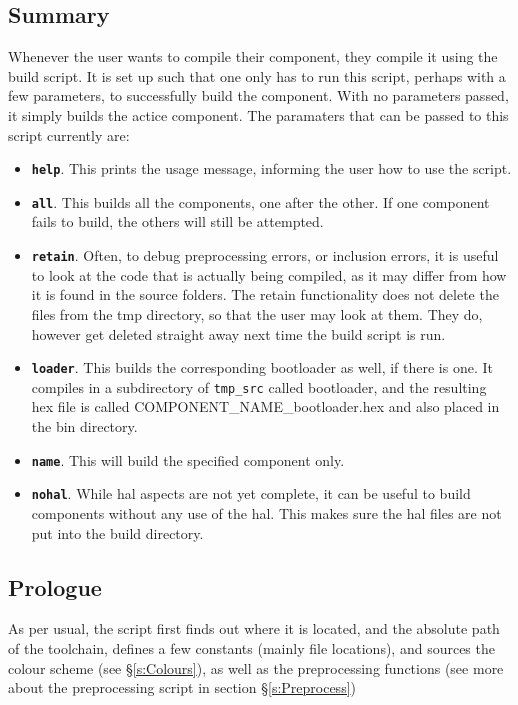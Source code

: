 \documentclass[a4paper, oneside, 11pt, titlepage, onecolumn, openright]{report}
\begin{document}
\subsection{Summary}
			\label{ss:buildSummary}
			Whenever the user wants to compile their component, they compile it using the build script. It is set up such that one only has to run this script, perhaps with a few parameters, to successfully build the component. With no parameters passed, it simply builds the actice component.
			The paramaters that can be passed to this script currently are:
			
\begin{itemize}
\item \texttt{\textbf{help}}. This prints the usage message, informing the user how to use the script.
\item \texttt{\textbf{all}}. This builds all the components, one after the other. If one component fails to build, the others will still be attempted.
\item \texttt{\textbf{retain}}. Often, to debug preprocessing errors, or inclusion errors, it is useful to look at the code that is actually being compiled, as it may differ from how it is found in the source folders. The retain functionality does not delete the files from the tmp directory, so that the user may look at them. They do, however get deleted straight away next time the build script is run.
\item \texttt{\textbf{loader}}. This builds the corresponding bootloader as well, if there is one. It compiles in a subdirectory of \texttt{tmp\_src} called bootloader, and the resulting hex file is called COMPONENT\_NAME\_bootloader.hex and also placed in the bin directory.
\item \texttt{\textbf{name}}. This will build the specified component only.
\item \texttt{\textbf{nohal}}. While hal aspects are not yet complete, it can be useful to build components without any use of the hal. This makes sure the hal files are not put into the build directory.
\end{itemize}

\subsection{Prologue}
			\label{ss:buildPrologue}
			As per usual, the script first finds out where it is located, and the absolute path of the toolchain, defines a few constants (mainly file locations), and sources the colour scheme (see \S\ref{s:Colours}), as well as the preprocessing functions (see more about the preprocessing script in section \S\ref{s:Preprocess})
			
\end{document}
